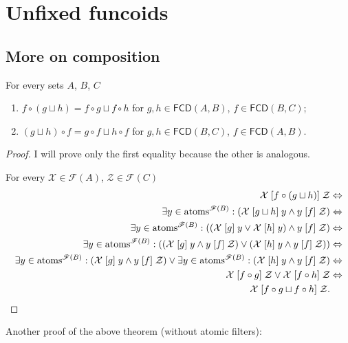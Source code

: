 \chapter{Unfixed funcoids}

\section{More on composition}

\begin{lem}
For every sets $A$, $B$, $C$
\begin{enumerate}
\item $f\circ(g\sqcup h)=f\circ g\sqcup f\circ h$ for $g,h\in\mathsf{FCD}(A,B)$,
$f\in\mathsf{FCD}(B,C)$;
\item $(g\sqcup h)\circ f=g\circ f\sqcup h\circ f$ for
$g,h\in\mathsf{FCD}(B,C)$,
$f\in\mathsf{FCD}(A,B)$.
\end{enumerate}
\end{lem}
\begin{proof}
I will prove only the first equality because the other is analogous.

For every $\mathcal{X}\in\mathscr{F}(A)$, $\mathcal{Z}\in\mathscr{F}(C)$
\begin{align*}
\mathcal{X}\mathrel{\left[f\circ(g\sqcup h)\right]}\mathcal{Z} & \Leftrightarrow\\
\exists y\in\operatorname{atoms}^{\mathscr{F}(B)}:(\mathcal{X}\mathrel{\left[g\sqcup h\right]}y\land
y\mathrel{\left[f\right]}\mathcal{Z}) & \Leftrightarrow\\
\exists y\in\operatorname{atoms}^{\mathscr{F}(B)}:((\mathcal{X}\mathrel{\left[g\right]}y\lor\mathcal{X}\mathrel{\left[h\right]}y)\land y\mathrel{\left[f\right]}\mathcal{Z}) & \Leftrightarrow\\
\exists y\in\operatorname{atoms}^{\mathscr{F}(B)}:((\mathcal{X}\mathrel{\left[g\right]}y\land y\mathrel{\left[f\right]}\mathcal{Z})\lor(\mathcal{X}\mathrel{\left[h\right]}y\land y\mathrel{\left[f\right]}\mathcal{Z})) &
\Leftrightarrow\\
\exists y\in\operatorname{atoms}^{\mathscr{F}(B)}:(\mathcal{X}\mathrel{\left[g\right]}y\land y\mathrel{\left[f\right]}\mathcal{Z})\lor\exists y\in\operatorname{atoms}^{\mathscr{F}(B)}:(\mathcal{X}\mathrel{\left[h\right]}y\land
y\mathrel{\left[f\right]}\mathcal{Z}) & \Leftrightarrow\\
\mathcal{X}\mathrel{\left[f\circ g\right]}\mathcal{Z}\lor\mathcal{X}\mathrel{\left[f\circ
h\right]}\mathcal{Z} & \Leftrightarrow\\
\mathcal{X}\mathrel{\left[f\circ g\sqcup f\circ h\right]}\mathcal{Z}.
\end{align*}

\end{proof}
Another proof of the above theorem (without atomic filters):
